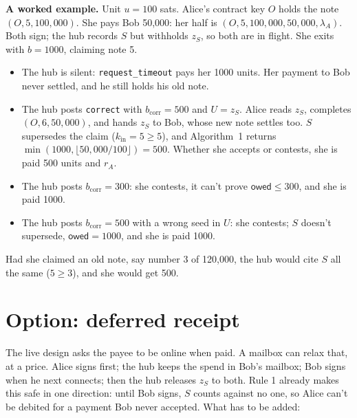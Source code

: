 \documentclass[11pt]{article}
\theoremstyle{plain}
\theoremstyle{definition}
\newcommand{\bcorr}{b_{\mathrm{corr}}}
\newcommand{\tx}[1]{\texttt{#1}}
\newcommand{\owed}{\mathsf{owed}}
\newcommand{\kin}{k_{\mathrm{in}}}
\begin{document}
\textbf{A worked example.} Unit $u = 100$ sats. Alice's contract key $O$
holds the note $(O, 5, 100{,}000)$. She pays Bob 50,000: her half is
$(O, 5, 100{,}000, 50{,}000, \lambda_A)$. Both sign; the hub records $S$
but withholds $z_S$, so both are in flight. She exits with $b = 1000$,
claiming note 5.
\begin{itemize}[nosep]
\item The hub is silent: \tx{request\_timeout} pays her 1000 units. Her
  payment to Bob never settled, and he still holds his old note.
\item The hub posts \tx{correct} with $\bcorr = 500$ and $U = z_S$.
  Alice reads $z_S$, completes $(O, 6, 50{,}000)$, and hands $z_S$ to
  Bob, whose new note settles too. $S$ supersedes the claim ($\kin = 5
  \ge 5$), and Algorithm~1 returns $\min(1000, \lfloor
  50{,}000/100\rfloor) = 500$. Whether she accepts or contests, she is
  paid 500 units and $r_A$.
\item The hub posts $\bcorr = 300$: she contests, it can't prove $\owed
  \le 300$, and she is paid 1000.
\item The hub posts $\bcorr = 500$ with a wrong seed in $U$: she
  contests; $S$ doesn't supersede, $\owed = 1000$, and she is paid 1000.
\end{itemize}
Had she claimed an old note, say number 3 of 120,000, the hub would
cite $S$ all the same ($5 \ge 3$), and she would get 500.

\section{Option: deferred receipt}\label{sec:deferred}

The live design asks the payee to be online when paid. A mailbox can
relax that, at a price. Alice signs first; the hub keeps the spend in
Bob's mailbox; Bob signs when he next connects; then the hub releases
$z_S$ to both. Rule 1 already makes this safe in one direction: until
Bob signs, $S$ counts against no one, so Alice can't be debited for a
payment Bob never accepted. What has to be added:
\end{document}
